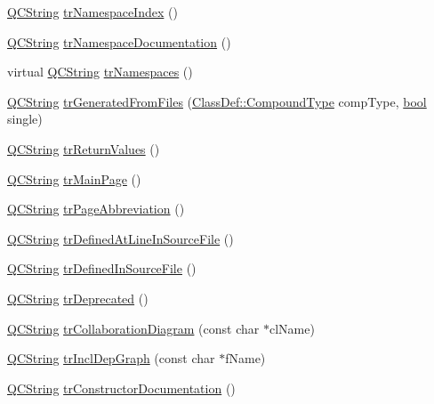 \begin{DoxyCompactItemize}
\item 
\hyperlink{class_q_c_string}{Q\+C\+String} \hyperlink{class_translator_slovene_a38fe4e3c9ac5c14586e93dd6f7918686}{tr\+Namespace\+Index} ()
\item 
\hyperlink{class_q_c_string}{Q\+C\+String} \hyperlink{class_translator_slovene_aac9ca444ecdf4cbf93b2924620c70a39}{tr\+Namespace\+Documentation} ()
\item 
virtual \hyperlink{class_q_c_string}{Q\+C\+String} \hyperlink{class_translator_slovene_add5425ba38e8d628a8548a5cd93ef0c9}{tr\+Namespaces} ()
\item 
\hyperlink{class_q_c_string}{Q\+C\+String} \hyperlink{class_translator_slovene_a37891d699740842b4583a8a185140cbc}{tr\+Generated\+From\+Files} (\hyperlink{class_class_def_ae70cf86d35fe954a94c566fbcfc87939}{Class\+Def\+::\+Compound\+Type} comp\+Type, \hyperlink{qglobal_8h_a1062901a7428fdd9c7f180f5e01ea056}{bool} single)
\item 
\hyperlink{class_q_c_string}{Q\+C\+String} \hyperlink{class_translator_slovene_a23840e57d61b02871f444926553c4a6f}{tr\+Return\+Values} ()
\item 
\hyperlink{class_q_c_string}{Q\+C\+String} \hyperlink{class_translator_slovene_aab9af959a4ec7611e76d4d725a8eb748}{tr\+Main\+Page} ()
\item 
\hyperlink{class_q_c_string}{Q\+C\+String} \hyperlink{class_translator_slovene_a80c864485225b2018f3c518f3f95c1f1}{tr\+Page\+Abbreviation} ()
\item 
\hyperlink{class_q_c_string}{Q\+C\+String} \hyperlink{class_translator_slovene_a11a17759b13a7b0ace5b57c7ef8126eb}{tr\+Defined\+At\+Line\+In\+Source\+File} ()
\item 
\hyperlink{class_q_c_string}{Q\+C\+String} \hyperlink{class_translator_slovene_a12574e71eac363da755aa415c53a524e}{tr\+Defined\+In\+Source\+File} ()
\item 
\hyperlink{class_q_c_string}{Q\+C\+String} \hyperlink{class_translator_slovene_aac1ea34816ffccd4558d12270565b73e}{tr\+Deprecated} ()
\item 
\hyperlink{class_q_c_string}{Q\+C\+String} \hyperlink{class_translator_slovene_a741a97b0516f06bc2b2c0d3c10e8e2ba}{tr\+Collaboration\+Diagram} (const char $\ast$cl\+Name)
\item 
\hyperlink{class_q_c_string}{Q\+C\+String} \hyperlink{class_translator_slovene_aa59b374f5a40cd6958dd5f24e43bed02}{tr\+Incl\+Dep\+Graph} (const char $\ast$f\+Name)
\item 
\hyperlink{class_q_c_string}{Q\+C\+String} \hyperlink{class_translator_slovene_ad2bb490e77c2125cbfc1f92b3062bdb7}{tr\+Constructor\+Documentation} ()

\end{DoxyCompactItemize}
